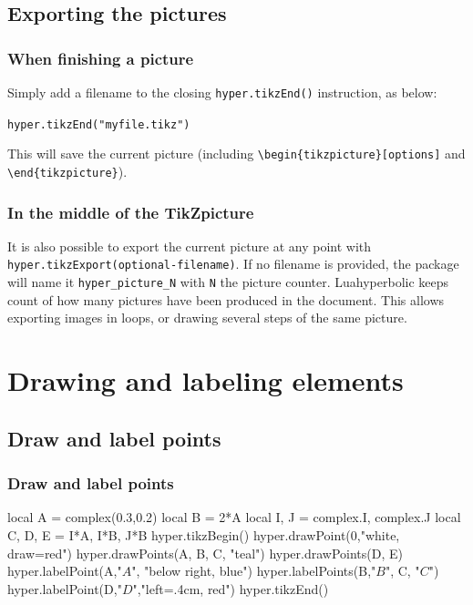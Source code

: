 \documentclass{article}
\begin{document}
 
\subsection{Exporting the pictures}

\subsubsection{When finishing a picture}
Simply add a filename to the closing \texttt{hyper.tikzEnd()} instruction, as below:
\begin{center}
\texttt{hyper.tikzEnd("myfile.tikz")}
\end{center}

This will save the current picture (including \verb+\begin{tikzpicture}[options]+ and \verb+\end{tikzpicture}+).

\subsubsection{In the middle of the TikZpicture}

It is also possible to export the current picture at any point with \verb+hyper.tikzExport(optional-filename)+.
If no filename is provided, the package will name it \verb+hyper_picture_N+ with \texttt{N} the picture counter. Luahyperbolic keeps count of how many pictures have been produced in the document.
This allows exporting images in loops, or drawing several steps of the same picture.


\section{Drawing and labeling elements}


\subsection{Draw and label points}

\subsubsection{Draw and label points}
\begin{codeandresult}
\begin{luacode*}
local A = complex(0.3,0.2)
local B = 2*A
local I, J = complex.I, complex.J
local C, D, E = I*A, I*B, J*B
hyper.tikzBegin()
hyper.drawPoint(0,"white, draw=red")
hyper.drawPoints(A, B, C, "teal")
hyper.drawPoints(D, E)
hyper.labelPoint(A,"$A$", "below right, blue")
hyper.labelPoints(B,"$B$", C, "$C$")
hyper.labelPoint(D,"$D$","left=.4cm, red")
hyper.tikzEnd()
\end{luacode*}
\end{codeandresult}
\end{document}
